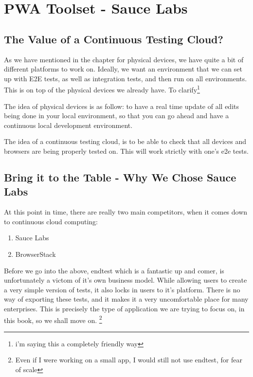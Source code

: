 \maketitle{}
\section{ PWA Toolset - Sauce Labs }

\subsection{ The Value of a Continuous Testing Cloud? }

As we have mentioned in the chapter for physical devices, we have quite a bit of
different platforms to work on. Ideally, we want an environment that we can set
up with E2E tests, as well as integration tests, and then run on all environments.
This is on top of the physical devices we already have. To clarify\footnote{i'm saying this a completely friendly way}

The idea of physical devices is as follow: to have a real time update of all
edits being done in your local environment, so that you can go ahead and have a
continuous local development environment.

The idea of a continuous testing cloud, is to be able to check that all devices
and browsers are being properly tested on. This will work strictly with one's
e2e tests.

\subsection{ Bring it to the Table - Why We Chose Sauce Labs }

At this point in time, there are really two main competitors, when it comes
down to continuous cloud computing:

\begin{enumerate}
  \item Sauce Labs
  \item BrowserStack
\end{enumerate}

Before we go into the above, endtest which is a fantastic up and comer, is
unfortunately a victom of it's own business model. While allowing users to
create a very simple version of tests, it also locks in users to it's platform.
There is no way of exporting these tests, and it makes it a very uncomfortable
place for many enterprises. This is precisely the type of application we are
trying to focus on, in this book, so we shall move on. \footnote{Even if I were
working on a small app, I would still not use endtest, for fear of scale}

